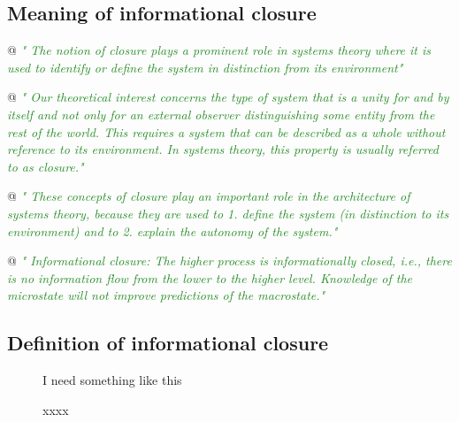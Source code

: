 \documentclass[utf8]{article}
\newenvironment{ants}
			{
			 \begin{easylist}[itemize]
			}
			{
			\end{easylist}
			}
\newcommand{\rewrite}[1]{\textcolor{ForestGreen}{\textit{"#1"}}\newline}
\newcommand{\includegraphicsTodo}[2][]{%
			\tcbox[%
				adjusted title=\LARGE To Be Modified,
				halign title=right,
				colbacktitle=Orange!75!White,
				coltitle=Black,
				colframe=Red!60!White,
				boxrule=1mm,
				colback=white%
				]{\texttt{[image: \#2]}}}
\begin{document}
		\subsection*{Meaning of informational closure}
			\begin{ants}
				@ \rewrite{
					The notion of closure plays a prominent role in systems theory where it is used to identify or define the system in distinction from its environment} \cite{BERTSCHINGER.2006}
		
				@ \rewrite{
					Our theoretical interest concerns the type of system that is a unity for and by itself and not only for an external observer distinguishing some entity from the rest of the world. This requires a system that can be described as a whole without reference to its environment. In systems theory, this property is usually referred to as closure.}\citep{BERTSCHINGER.2006}
				
				@ \rewrite{
					These concepts of closure play an important role in the architecture of systems
					theory, because they are used to
					1. define the system (in distinction to its environment) and to 
					2. explain the autonomy of the system.}\citep{BERTSCHINGER.2006}
				
				@ \rewrite{
					Informational closure: The higher process is informationally closed, i.e., there is no information flow from the lower to the higher level. Knowledge of the microstate will not improve predictions of the macrostate.} \citep[p. 4]{PFANTE.2014}
				
								
			\end{ants}
	
	
		\subsection*{Definition of informational closure}
		
			\begin{figure}
				\includegraphicsTodo[width=\textwidth]{WritingMaterials/PDFXCview_2018-06-07_17-45-59.png} 
				\cite{BERTSCHINGER.2006} I need something like this 
				\caption{xxxx}
				\label{fig:AgentAndEnv}			
			\end{figure}
\end{document}
